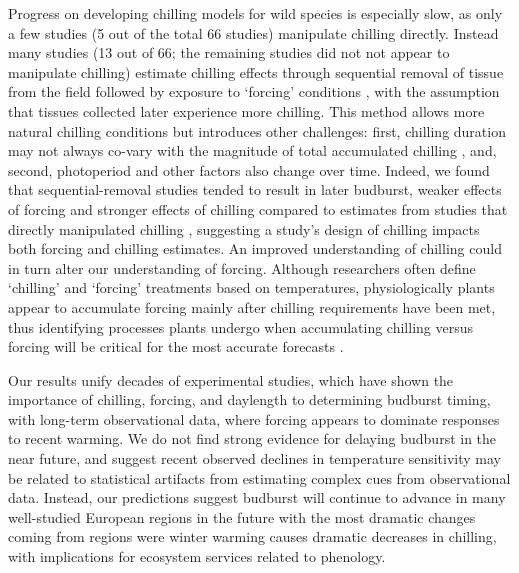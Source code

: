 \documentclass{article}
\begin{document}
\par Progress on developing chilling models for wild species is especially slow, as only a few studies (5 out of the total 66 studies) manipulate chilling directly. Instead many studies (13 out of 66; the remaining studies did not not appear to manipulate chilling) estimate chilling effects through sequential removal of tissue from the field followed by exposure to `forcing' conditions \citep{weinberger1950}, with the assumption that tissues collected later experience more chilling. This method allows more natural chilling conditions but introduces other challenges: first, chilling duration may not always co-vary with the magnitude of total accumulated chilling \citep{dennis2003}, and, second, photoperiod and other factors also change over time. Indeed, we found that sequential-removal studies tended to result in later budburst, weaker effects of forcing and stronger effects of chilling compared to estimates from studies that directly manipulated chilling \citep[Fig. 4S][]{weinberger1950,polgar2013}, suggesting a study's design of chilling impacts both forcing and chilling estimates. An improved understanding of chilling could in turn alter our understanding of forcing. Although researchers often define `chilling' and `forcing' treatments based on temperatures, physiologically plants appear to accumulate forcing mainly after chilling requirements have been met,  thus identifying processes plants undergo when accumulating chilling versus forcing will be critical for the most accurate forecasts \citep{chuine2016}.
 \par Our results unify decades of experimental studies, which have shown the importance of chilling, forcing, and daylength to determining budburst timing, with long-term observational data, where forcing appears to dominate responses to recent warming. We do not find strong evidence for delaying budburst in the near future, and suggest recent observed declines in temperature sensitivity may be related to statistical artifacts from estimating complex cues from observational data. Instead, our predictions suggest budburst will continue to advance in many well-studied European regions in the future with the most dramatic changes coming from regions were winter warming causes dramatic decreases in chilling, with implications for ecosystem services related to phenology. %
 
\end{document}
